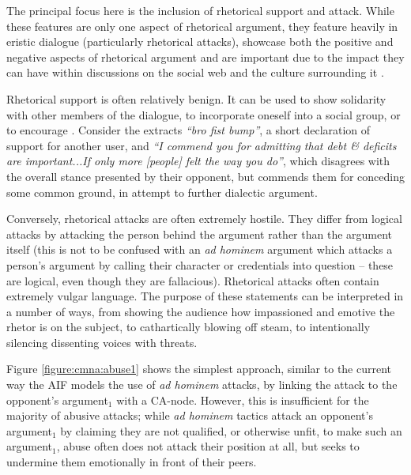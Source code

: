 \newcommand{\scaleProps}{0.7}



The principal focus here is the inclusion of rhetorical support and attack. While these features are only one aspect of rhetorical argument, they feature heavily in eristic dialogue (particularly rhetorical attacks), showcase both the positive and negative aspects of rhetorical argument and are important due to the impact they can have within discussions on the social web and the culture surrounding it \citep{Blount2015}.

Rhetorical support is often relatively benign. It can be used to show solidarity with other members of the dialogue, to incorporate oneself into a social group, or to encourage . Consider the extracts \textit{``bro fist bump''}, a short declaration of support for another user, and \textit{``I commend you for admitting that debt \& deficits are important...If only more [people] felt the way you do''}, which disagrees with the overall stance presented by their opponent, but commends them for conceding some common ground, in attempt to further dialectic argument.

Conversely, rhetorical attacks are often extremely hostile. They differ from logical attacks by attacking the person behind the argument rather than the argument itself (this is not to be confused with an \textit{ad hominem} argument which attacks a person's argument by calling their character or credentials into question -- these are logical, even though they are fallacious). Rhetorical attacks often contain extremely vulgar language.
The purpose of these statements can be interpreted in a number of ways, from showing the audience how impassioned and emotive the rhetor is on the subject, to cathartically blowing off steam, to intentionally silencing dissenting voices with threats.

Figure \ref{figure:cmna:abuse1} shows the simplest approach, similar to the current way the AIF models the use of \textit{ad hominem} attacks, by linking the attack to the opponent's argument$_1$ with a CA-node. However, this is insufficient for the majority of abusive attacks; while \textit{ad hominem} tactics attack an opponent's argument$_1$ by claiming they are not qualified, or otherwise unfit, to make such an argument$_1$, abuse often does not attack their position at all, but seeks to undermine them emotionally in front of their peers.

